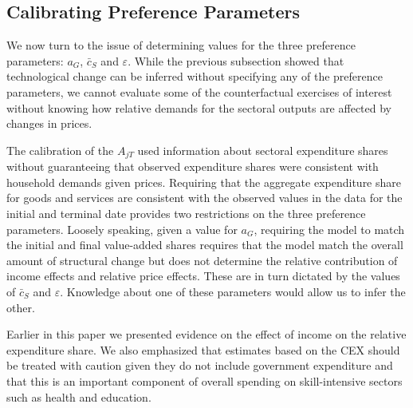 \documentclass[12pt,english]{article}
\begin{document}
\subsection{Calibrating Preference Parameters}

{\normalsize We now turn to the issue of determining values for the three
preference parameters: $a_{G}$, $\bar{c}_{S}$ and $\varepsilon $. While the
previous subsection showed that technological change can be inferred without
specifying any of the preference parameters, we cannot evaluate some of the
counterfactual exercises of interest without knowing how relative demands
for the sectoral outputs are affected by changes in prices. }

{\normalsize The calibration of the $A_{jT}$ used information about sectoral
expenditure shares without guaranteeing that observed expenditure shares
were consistent with household demands given prices. Requiring that the
aggregate expenditure share for goods and services are consistent with the
observed values in the data for the initial and terminal date provides two
restrictions on the three preference parameters. Loosely speaking, given a
value for $a_{G}$, requiring the model to match the initial and final
value-added shares requires that the model match the overall amount of
structural change but does not determine the relative contribution of income
effects and relative price effects. These are in turn dictated by the values
of $\bar{c}_{S}$ and $\varepsilon $. Knowledge about one of these parameters
would allow us to infer the other. }

{\normalsize Earlier in this paper we presented evidence on the effect of
income on the relative expenditure share. We also emphasized that estimates
based on the CEX should be treated with caution given they do not include
government expenditure and that this is an important component of overall
spending on skill-intensive sectors such as health and education. }
\end{document}
